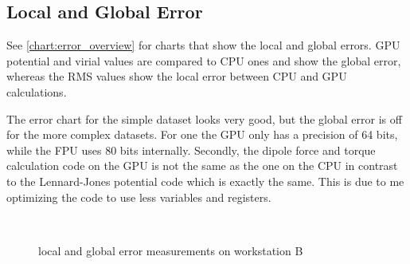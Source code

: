 \subsection{Local and Global Error}
See \autoref{chart:error_overview} for charts that show the local and global errors. GPU potential and virial values are compared to CPU ones and show the global error, whereas the RMS values show the local error between CPU and GPU calculations.

The error chart for the simple  dataset looks very good, but the global error is off for the more complex datasets.
For one the GPU only has a precision of 64 bits, while the FPU uses 80 bits internally.
Secondly, the dipole force and torque calculation code on the GPU is not the same as the one on the CPU in contrast to the Lennard-Jones potential code which is exactly the same.
This is due to me optimizing the code to use less variables and registers.

\begin{figure}
\centering
{}
\\
\caption{local and global error measurements on workstation B}
\label{chart:error_overview}
\end{figure}